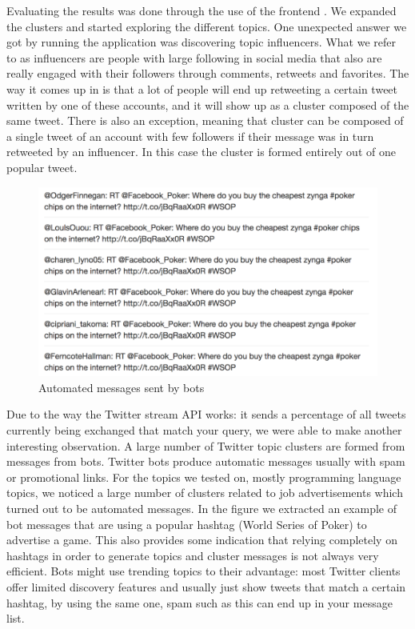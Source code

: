 Evaluating the results was done through the use of the frontend {\frontend}. We expanded the clusters and started exploring the different topics. 
One unexpected answer we got by running the application was discovering topic influencers. What we refer to as influencers are people with large following in social media that also are really engaged with their followers through comments, retweets and favorites. The way it comes up in {\project}  is that a lot of people will end up retweeting a certain tweet written by one of these accounts, and it will show up as a cluster composed of the same tweet. There is also an exception, meaning that cluster can be composed of a single tweet of an account with few followers if their message was in turn retweeted by an influencer. In this case the cluster is formed entirely out of one popular tweet.
\newline
\begin{figure}[ht!]
\centering
\includegraphics[width=\textwidth,height=\textheight,keepaspectratio]{src/img/bots.png}
\caption{Automated messages sent by bots\label{overflow}}
\end{figure}
\newline
Due to the way the Twitter stream API works: it sends a percentage of all tweets currently being exchanged that match your query, we were able to make another interesting observation. A large number of Twitter topic clusters are formed from messages from bots. Twitter bots produce automatic messages usually with spam or promotional links. For the topics we tested on, mostly programming language topics, we noticed a large number of clusters related to job advertisements which turned out to be automated messages.
In the figure we extracted an example of bot messages that are using a popular hashtag (World Series of Poker) to advertise a game. This also provides some indication that relying completely on hashtags in order to generate topics and cluster messages is not always very efficient. Bots might use trending topics to their advantage: most Twitter clients offer limited discovery features and usually just show tweets that match a certain hashtag, by using the same one, spam such as this can end up in your message list.